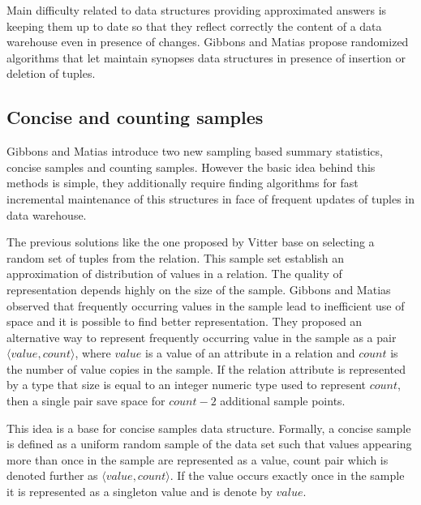 Main difficulty related to data structures providing approximated answers is
keeping them up to date so that they reflect correctly the content
of a data warehouse even in presence of changes.
Gibbons and Matias \cite{GM98} propose randomized algorithms that let
maintain synopses data structures in presence of insertion
or deletion of tuples.

\subsection{Concise and counting samples}
Gibbons and Matias \cite{GM98} introduce two new sampling based summary
statistics, concise samples and counting samples. However the basic
idea behind this methods is simple, they additionally require finding
algorithms for fast incremental maintenance of this structures in face
of frequent updates of tuples in data warehouse.


The previous solutions like the one proposed by Vitter \cite{Vit85}
base on selecting a random set of tuples from the relation.
This sample set establish an approximation of distribution of values
in a relation. The quality of representation depends highly on the size of
the sample. Gibbons and Matias \cite{GM98} observed that frequently occurring values in the
sample lead to inefficient use of space and it is possible to find
better representation.
They proposed an alternative way to represent frequently occurring
value in the sample as a pair $\langle value, count \rangle$, where
$value$ is a value of an attribute in a relation and $count$ is the
number of value copies in the sample. If the relation attribute is
represented by a type that size is equal to an integer numeric
type used to represent $count$, then a single pair
save space for $count - 2$ additional sample points.

This idea is a base for concise samples data structure. Formally,
a concise sample is defined as a uniform
random sample of the data set such that values appearing more than
once in the sample are represented as a value, count pair which
is denoted further as $\langle value, count \rangle$. If the
value occurs exactly once in the sample it is represented as a
singleton value and is denote by $value$.


